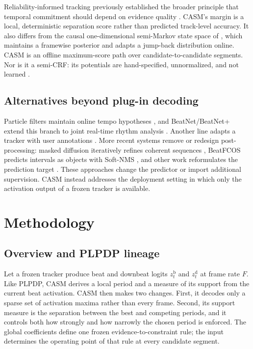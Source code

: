 \documentclass{article}
\begin{document}
Reliability-informed tracking previously established the broader principle
that temporal commitment should depend on evidence quality
\cite{degara2012reliability}. CASM's margin is a local, deterministic separation
score rather than predicted track-level accuracy. It also differs from the
causal one-dimensional semi-Markov state space of \cite{heydari2022semimarkov},
which maintains a framewise posterior and adapts a jump-back distribution
online. CASM is an offline maximum-score path over candidate-to-candidate
segments. Nor is it a semi-CRF: its potentials are hand-specified, unnormalized,
and not learned \cite{sarawagi2004semimarkov}.

\subsection{Alternatives beyond plug-in decoding}

Particle filters maintain online tempo hypotheses \cite{hainsworth2004particle},
and BeatNet/BeatNet+ extend this branch to joint real-time rhythm analysis
\cite{heydari2021beatnet,heydari2024beatnetplus}. Another line adapts a tracker
with user annotations \cite{pinto2021userdriven,maia2022adapting,
pinto2023bridging,maia2024selective,pinto2026challenging}. More recent systems
remove or redesign post-processing: masked diffusion iteratively refines
coherent sequences \cite{foscarin2026masked}, BeatFCOS predicts intervals as
objects with Soft-NMS \cite{ahn2025beatfcos}, and other work reformulates the
prediction target \cite{bolt2026reformulated}. These approaches change the
predictor or import additional supervision. CASM instead addresses the
deployment setting in which only the activation output of a frozen tracker is
available.

\section{Methodology}
\label{sec:method}

\subsection{Overview and PLPDP lineage}
\label{sec:casm}
Let a frozen tracker produce beat and downbeat logits $z_t^{\mathrm b}$ and
$z_t^{\mathrm d}$ at frame rate $F$. Like PLPDP, CASM derives a local period
and a measure of its support from the current beat activation. CASM then makes
two changes. First, it decodes only a sparse set of activation maxima rather
than every frame. Second, its support measure is the separation between the
best and competing periods, and it controls both how strongly and how narrowly
the chosen period is enforced. The global coefficients define one frozen
evidence-to-constraint rule; the input determines the operating point of that
rule at every candidate segment.
\end{document}
